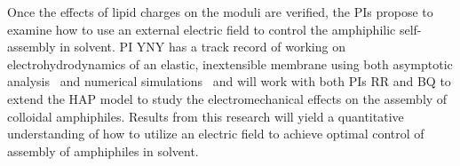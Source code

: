 Once the effects of lipid charges on the moduli are verified, the PIs
propose to examine how to use an external electric field to control the
amphiphilic self-assembly in solvent. PI YNY has a track record of
working on electrohydrodynamics of an elastic, inextensible membrane
using both asymptotic analysis~\cite{Nganguia2013_PRE, Young2014_JFM,
Young2015_PoF} and numerical simulations~\cite{Nganguia2015_CiCP} and
will work with both PIs RR and BQ to extend the HAP model to study the
electromechanical effects on the assembly of colloidal amphiphiles.
Results from this research will yield a quantitative understanding of
how to utilize an electric field to achieve optimal control of assembly
of amphiphiles in solvent.




